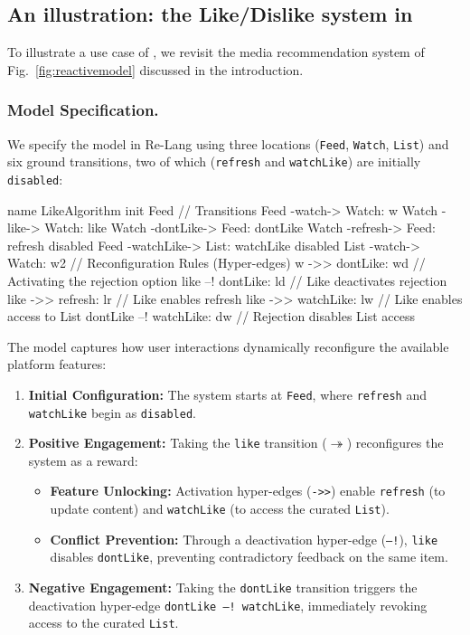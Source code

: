 \subsection{An illustration: the Like/Dislike system in \RTATool}

To illustrate a use case of \RTATool, we revisit the media recommendation system of Fig.~\ref{fig:reactivemodel} discussed in the introduction.

\subsubsection*{Model Specification.}
We specify the model in \textsf{Re-Lang} using three locations (\texttt{Feed}, \texttt{Watch}, \texttt{List}) and six ground transitions, two of which (\texttt{refresh} and \texttt{watchLike}) are initially \texttt{disabled}:

{\scriptsize
\begin{codeblock}
name LikeAlgorithm
init Feed
// Transitions
Feed -watch-> Watch: w
Watch -like-> Watch: like
Watch -dontLike-> Feed: dontLike
Watch -refresh-> Feed: refresh disabled
Feed -watchLike-> List: watchLike disabled
List -watch-> Watch: w2
// Reconfiguration Rules (Hyper-edges)
w ->> dontLike: wd         // Activating the rejection option
like --! dontLike: ld      // Like deactivates rejection
like ->> refresh: lr       // Like enables refresh
like ->> watchLike: lw     // Like enables access to List
dontLike --! watchLike: dw // Rejection disables List access
\end{codeblock}
}

\noindent The model captures how user interactions dynamically reconfigure the available platform features:
\begin{enumerate}
    \item \textbf{Initial Configuration:} The system starts at \texttt{Feed}, where \texttt{refresh} and \texttt{watchLike} begin as \texttt{disabled}.
    \item \textbf{Positive Engagement:} Taking the \texttt{like} transition ($\twoheadrightarrow$) reconfigures the system as a reward:
    \begin{itemize}
        \item \textbf{Feature Unlocking:} Activation hyper-edges (\texttt{->>}) enable \texttt{refresh} (to update content) and \texttt{watchLike} (to access the curated \texttt{List}).
        \item \textbf{Conflict Prevention:} Through a deactivation hyper-edge (\texttt{--!}), \texttt{like} disables \texttt{dontLike}, preventing contradictory feedback on the same item.
    \end{itemize}
    \item \textbf{Negative Engagement:} Taking the \texttt{dontLike} transition triggers the deactivation hyper-edge \texttt{dontLike --! watchLike}, immediately revoking access to the curated \texttt{List}.
\end{enumerate}

